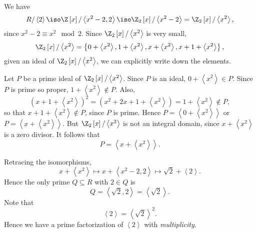 \documentclass[pmath441]{subfiles}
\begin{document}
    \begin{answer}
        We have
        \begin{equation*}
            R /\left< 2 \right> \iso \Z\left[ x \right] / \left< x^{2}-2,2 \right> \iso \Z_2\left[ x \right] / \left< x^{2}-2 \right> = \Z_2\left[ x \right] / \left< x^{2} \right>,
        \end{equation*}
        since $x^{2}-2 \equiv x^{2} \mod 2$. Since $\Z_2\left[ x \right] / \left< x^{2} \right>$ is very small,
        \begin{equation*}
            \Z_2\left[ x \right] / \left< x^{2} \right> = \left\lbrace 0+\left< x^{2} \right>,1+\left< x^{2} \right>,x+\left< x^{2} \right>,x+1+\left< x^{2} \right> \right\rbrace ,
        \end{equation*}
        given an ideal of $\Z_2\left[ x \right] / \left< x^{2} \right>$, we can explicitly write down the elements. 
        
        Let $P$ be a prime ideal of $\Z_2\left[ x \right] /\left< x^{2} \right>$. Since $P$ is an ideal, $0+\left< x^{2} \right>\in P$. Since $P$ is prime so proper, $1+\left< x^{2} \right>\notin P$. Also,
        \begin{equation*}
            \left( x+1+\left< x^{2} \right>  \right)^{2} = \left( x^{2}+2x+1+\left< x^{2} \right>  \right) = 1+\left< x^{2} \right>\notin P,
        \end{equation*}
        so that $x+1+\left< x^{2} \right>\notin P$, since $P$ is prime. Hence $P = \left< 0+\left< x^{2} \right>  \right>$ or $P = \left< x+\left< x^{2} \right>  \right>$. But $\Z_2\left[ x \right] / \left< x^{2} \right>$ is not an integral domain, since $x+\left< x^{2} \right> $ is a zero divisor. It follows that
        \begin{equation*}
            P = \left< x+\left< x^{2} \right>  \right>. 
        \end{equation*}

        Retracing the isomorphisms,
        \begin{equation*}
            x+\left< x^{2} \right> \mapsto x+\left< x^{2}-2,2 \right> \mapsto \sqrt{2} + \left< 2 \right>.   
        \end{equation*}
        Hence the only prime $Q\subseteq R$ with $2\in Q$ is
        \begin{equation*}
            Q = \left< \sqrt{2},2 \right> = \left< \sqrt{2} \right>.  
        \end{equation*}
        Note that
        \begin{equation*}
            \left< 2 \right> = \left< \sqrt{2} \right>^{2}.  
        \end{equation*}
        Hence we have a prime factorization of $\left< 2 \right>$ with \textit{multiplicity}. 
    \end{answer}
    
\end{document}
